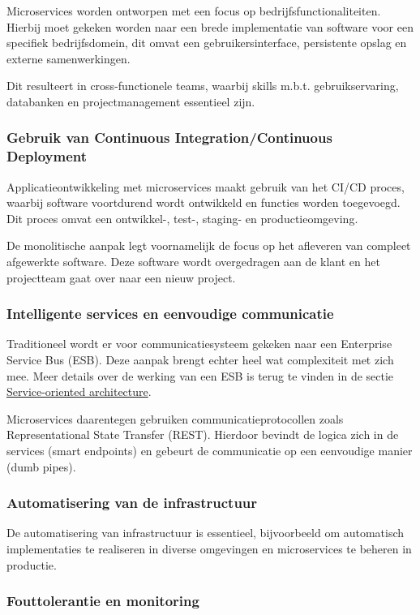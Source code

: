 Microservices worden ontworpen met een focus op bedrijfsfunctionaliteiten. Hierbij moet gekeken worden naar een brede implementatie van software voor een specifiek bedrijfsdomein, dit omvat een gebruikersinterface, persistente opslag en externe samenwerkingen.

Dit resulteert in cross-functionele teams, waarbij skills m.b.t. gebruikservaring, databanken en projectmanagement essentieel zijn.

\subsubsection{Gebruik van Continuous Integration/Continuous Deployment}

Applicatieontwikkeling met microservices maakt gebruik van het CI/CD proces, waarbij software voortdurend wordt ontwikkeld en functies worden toegevoegd. Dit proces omvat een ontwikkel-, test-, staging- en productieomgeving.

De monolitische aanpak legt voornamelijk de focus op het afleveren van compleet afgewerkte software. Deze software wordt overgedragen aan de klant en het projectteam gaat over naar een nieuw project.

\subsubsection{Intelligente services en eenvoudige communicatie}

Traditioneel wordt er voor communicatiesysteem gekeken naar een Enterprise Service Bus (ESB). Deze aanpak brengt echter heel wat complexiteit met zich mee. Meer details over de werking van een ESB is terug te vinden in de sectie \hyperref[sec:soa]{Service-oriented architecture}.

Microservices daarentegen gebruiken communicatieprotocollen zoals Representational State Transfer (REST). Hierdoor bevindt de logica zich in de services (smart endpoints) en gebeurt de communicatie op een eenvoudige manier (dumb pipes).

\subsubsection{Automatisering van de infrastructuur}

De automatisering van infrastructuur is essentieel, bijvoorbeeld om automatisch implementaties te realiseren in diverse omgevingen en microservices te beheren in productie.

\subsubsection{Fouttolerantie en monitoring}


